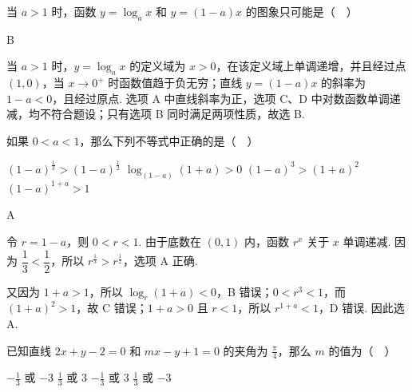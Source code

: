 \begin{problem}
当 \(a > 1\) 时，函数 \(y = \log_a x\) 和 \(y = (1 - a)x\) 的图象只可能是（\(\quad\)）

    {}
    {}
    {}
\end{problem}

\begin{answer}
B
\end{answer}

\begin{solution}
当 \(a>1\) 时，\(y=\log_a x\) 的定义域为 \(x>0\)，在该定义域上单调递增，并且经过点 \((1,0)\)，当 \(x\to0^+\) 时函数值趋于负无穷；直线 \(y=(1-a)x\) 的斜率为 \(1-a<0\)，且经过原点. 选项 A 中直线斜率为正，选项 C、D 中对数函数单调递减，均不符合题设；只有选项 B 同时满足两项性质，故选 B.
\end{solution}

\begin{problem}
如果 \(0 < a < 1\)，那么下列不等式中正确的是（\(\quad\)）

\choices
    {\((1 - a)^{\frac{1}{3}} > (1 - a)^{\frac{1}{2}}\)}
    {\(\log_{(1 - a)}(1 + a) > 0\)}
    {\((1 - a)^{3} > (1 + a)^{2}\)}
    {\((1 - a)^{1 + a} > 1\)}
\end{problem}

\begin{answer}
A
\end{answer}

\begin{solution}
令 \(r=1-a\)，则 \(0<r<1\). 由于底数在 \((0,1)\) 内，函数 \(r^x\) 关于 \(x\) 单调递减. 因为 \(\dfrac13<\dfrac12\)，所以 \(r^{\frac{1}{3}}>r^{\frac{1}{2}}\)，选项 A 正确.

又因为 \(1+a>1\)，所以 \(\log_r(1+a)<0\)，B 错误；\(0<r^3<1\)，而 \((1+a)^2>1\)，故 C 错误；\(1+a>0\) 且 \(r<1\)，所以 \(r^{1+a}<1\)，D 错误. 因此选 A.
\end{solution}

\begin{problem}
已知直线 \(2x + y - 2 = 0\) 和 \(mx - y + 1 = 0\) 的夹角为 \(\frac{\pi}{4}\)，那么 \(m\) 的值为（\(\quad\)）

\choices
    {\(-\frac{1}{3}\) 或 \(-3\)}
    {\(\frac{1}{3}\) 或 \(3\)}
    {\(-\frac{1}{3}\) 或 \(3\)}
    {\(\frac{1}{3}\) 或 \(-3\)}
\end{problem}

